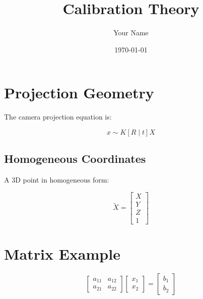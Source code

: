 \documentclass[11pt]{article}
\title{Calibration Theory}
\author{Your Name}
\date{\today}
\begin{document}
\maketitle
\tableofcontents
\newpage

\section{Projection Geometry}

The camera projection equation is:

\begin{equation}
x \sim K [R \mid t] X
\end{equation}

\subsection{Homogeneous Coordinates}

A 3D point in homogeneous form:

\begin{equation}
\tilde{X} =
\begin{bmatrix}
X \\
Y \\
Z \\
1
\end{bmatrix}
\end{equation}

\section{Matrix Example}

\begin{equation}
\begin{bmatrix}
a_{11} & a_{12} \\
a_{21} & a_{22}
\end{bmatrix}
\begin{bmatrix}
x_1 \\
x_2
\end{bmatrix}
=
\begin{bmatrix}
b_1 \\
b_2
\end{bmatrix}
\end{equation}
\end{document}
